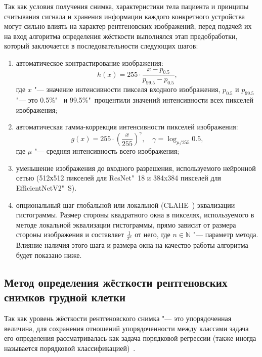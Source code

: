 Так как условия получения снимка, характеристики тела пациента и принципы считывания сигнала и хранения информации каждого конкретного устройства могут сильно влиять на характер рентгеновских изображений, перед подачей их на вход алгоритма определения жёсткости выполнялся этап предобработки, который заключается в последовательности следующих шагов:
\begin{enumerate}[beginpenalty=10000]
	\item автоматическое контрастирование изображения:
	\begin{equation}
	h \left( x \right) = 255 \cdot \frac{x - p_{0.5}}{p_{99.5} - p_{0.5}}, \nonumber
	\end{equation}
	где $x$ "--- значение интенсивности пикселя входного изображения, $p_{0.5}$ и $p_{99.5}$ "--- это 0.5\%"~ и 99.5\%"~процентили значений интенсивности всех пикселей изображения;
	\item автоматическая гамма-коррекция интенсивности пикселей изображения:
	\begin{equation}
	g \left( x \right) = 255 \cdot {\left( \frac{x}{255} \right)}^{\gamma}, \quad \gamma = \log_{\mu / 255}{0.5}, \nonumber
	\end{equation}
	где $\mu$ "--- средняя интенсивность всего изображения;
	\item уменьшение изображения до входного разрешения, используемого нейронной сетью (512х512 пикселей для  ResNet"~18 и 384x384 пикселей для EfficientNetV2"~S).
	\item опциональный шаг глобальной или локальной (CLAHE~\cite{pizer1987adaptive}) эквализации гистограммы. Размер стороны квадратного окна  в пикселях, используемого в методе локальной эквализации гистограммы, прямо зависит от размера стороны изображения и составляет $\frac{1}{2^n}$ от него, где $n\in\mathbb{N}$ "--- параметр метода. Влияние наличия этого шага и размера окна на качество работы алгоритма будет показано ниже.
\end{enumerate}

\subsection{Метод определения жёсткости рентгеновских снимков грудной клетки}

Так как уровень жёсткости рентгеновского снимка "--- это упорядоченная величина, для сохранения отношений упорядоченности между классами задача его определения рассматривалась как задача порядковой регрессии (также иногда называется порядковой классификацией)~\cite{7161338, 353a0d24-9c24-3a11-a330-afc86b9c39c8}.

